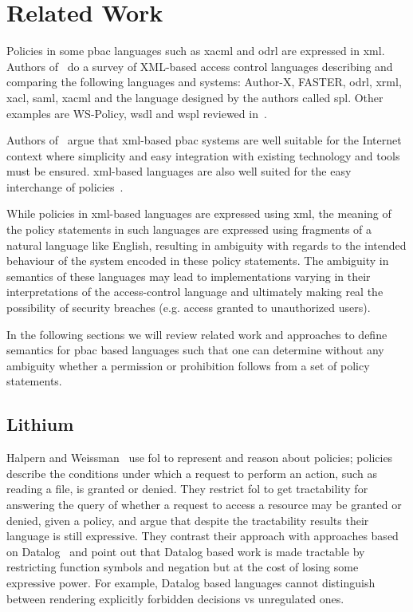 \chapter{Related Work}


Policies in some \ac{pbac} languages such as \ac{xacml} and \ac{odrl} are expressed in \ac{xml}. Authors of~\cite{surveyXML} do a survey of XML-based access control languages describing and comparing the following languages and systems: Author-X, FASTER, \ac{odrl}, \ac{xrml}, \ac{xacl}, \ac{saml}, \ac{xacml} and the language designed by the authors called \ac{spl}. Other examples are WS-Policy, \ac{wsdl} and \ac{wspl} reviewed in~\cite{ArdagnaDVS04}.

Authors of~\cite{ArdagnaDVS04} argue that \ac{xml}-based \ac{pbac} systems are well suitable for the Internet context where simplicity and easy integration with existing technology and tools must be ensured. \ac{xml}-based languages are also well suited for the easy interchange of policies~\cite{ArdagnaDVS04}. 

While policies in \ac{xml}-based languages are expressed using \ac{xml}, the meaning of the policy statements in such languages are expressed using fragments of a natural language like English, resulting in ambiguity with regards to the intended behaviour of the system encoded in these policy statements. The ambiguity in semantics of these languages may lead to implementations varying in their interpretations of the access-control language and ultimately making real the possibility of security breaches (e.g. access granted to unauthorized users). 

In the following sections we will review related work and approaches to define semantics for \ac{pbac} based languages such that one can determine without any ambiguity whether a permission or prohibition follows from a set of policy statements.
 
\section{Lithium}
Halpern and Weissman~\cite{Halpern2008} use \ac{fol} to represent and reason about policies; policies describe the conditions under which a request to perform an action, such as reading a file, is granted or denied. They restrict \ac{fol} to get tractability for answering the query of whether a request to access a resource may be granted or denied, given a policy, and argue that despite the tractability results their language is still expressive. They contrast their approach with approaches based on Datalog~\cite{datalog} and point out that Datalog based work is made tractable by restricting function symbols and negation but at the cost of losing some expressive power. For example, Datalog based languages cannot distinguish between rendering explicitly forbidden decisions vs unregulated ones.

